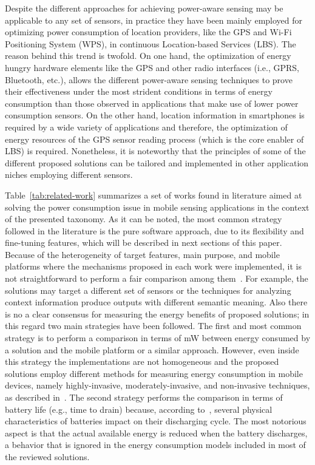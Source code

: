 \documentclass[12pt]{article}
\numberwithin{equation}{section}
\numberwithin{table}{section}
\numberwithin{figure}{section}
\begin{document}
Despite the different approaches for achieving power-aware sensing may be applicable to any set of sensors, in practice they have been mainly employed for optimizing power consumption of location providers, like the GPS and Wi-Fi Positioning System (WPS), in continuous Location-based Services (LBS).
The reason behind this trend is twofold.
On one hand, the optimization of energy hungry hardware elements like the GPS and other radio interfaces (i.e., GPRS, Bluetooth, etc.), allows the different power-aware sensing techniques to prove their effectiveness under the most strident conditions in terms of energy consumption than those observed in applications that make use of lower power consumption sensors.
On the other hand, location information in smartphones is required by a wide variety of applications and therefore, the optimization of energy resources of the GPS sensor reading process (which is the core enabler of LBS) is required.
Nonetheless, it is noteworthy that the principles of some of the different proposed solutions can be tailored and implemented in other application niches employing different sensors.

Table~\ref{tab:related-work} summarizes a set of works found in literature aimed at solving the power consumption issue in mobile sensing applications in the context of the presented taxonomy.
As it can be noted, the most common strategy followed in the literature is the pure software approach, due to its flexibility and fine-tuning features, which will be described in next sections of this paper.
Because of the heterogeneity of target features, main purpose, and mobile platforms where the mechanisms proposed in each work were implemented, it is not straightforward to perform a fair comparison among them~\cite{Vallina-Rodriguez2013,Neely2008}.
For example, the solutions may target a different set of sensors or the techniques for analyzing context information produce outputs with different semantic meaning.
Also there is no a clear consensus for measuring the energy benefits of proposed solutions; in this regard two main strategies have been followed.
The first and most common strategy is to perform a comparison in terms of mW between energy consumed by a solution and the mobile platform or a similar approach. 
However, even inside this strategy the implementations are not homogeneous and the proposed solutions employ different methods for measuring energy consumption in mobile devices, namely highly-invasive, moderately-invasive, and non-invasive techniques, as described in~\cite{Abreu2012}.
The second strategy performs the comparison in terms of battery life (e.g., time to drain) because, according to~\cite{Kim2014}, several physical characteristics of batteries impact on their discharging cycle.
The most notorious aspect is that the actual available energy is reduced when the battery discharges, a behavior that is ignored in the energy consumption models included in most of the reviewed solutions.
\end{document}
